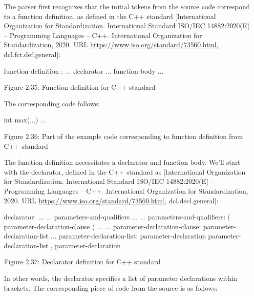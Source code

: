 The parser first recognizes that the initial tokens from the source code correspond to a function definition, as defined in the C++ standard [International Organization for Standardization. International Standard ISO/IEC 14882:2020(E) – Programming Languages – C++. International Organization for Standardization, 2020. URL \url{https://www.iso.org/standard/73560.html}, dcl.fct.def.general]:

\begin{shell}
function-definition :
    ... declarator ... function-body
    ...
\end{shell}

\begin{center}
Figure 2.35: Function definition for C++ standard
\end{center}

The corresponding code follows:

\begin{cpp}
int max(...) {
  ...
}
\end{cpp}

\begin{center}
Figure 2.36: Part of the example code corresponding to function definition from C++ standard
\end{center}

The function definition necessitates a declarator and function body. We’ll start with the declarator, defined in the C++ standard as [International Organization for Standardization. International Standard ISO/IEC 14882:2020(E) – Programming Languages – C++. International Organization for Standardization, 2020. URL \url{https://www.iso.org/standard/73560.html}, dcl.decl.general]:

\begin{shell}
declarator:
        ...
        ... parameters-and-qualifiers ...
...
parameters-and-qualifiers:
        ( parameter-declaration-clause ) ...
...
parameter-declaration-clause:
        parameter-declaration-list ...
parameter-declaration-list:
        parameter-declaration
        parameter-declaration-list , parameter-declaration
\end{shell}

\begin{center}
Figure 2.37: Declarator definition for C++ standard
\end{center}

In other words, the declarator specifies a list of parameter declarations within brackets. The corresponding piece of code from the source is as follows:

